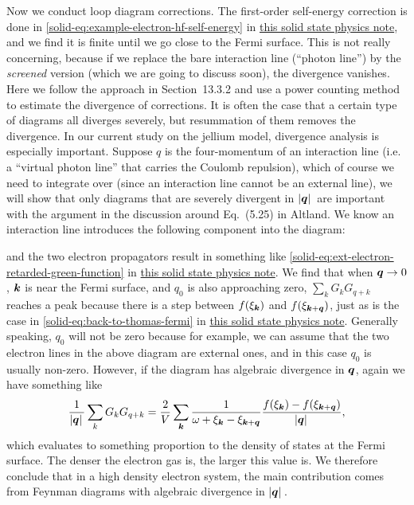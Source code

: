 \documentclass[hyperref, a4paper]{article}
\newcommand{\soliddoc}{\href{../solid/solid.pdf}{this solid state physics note}}
\begin{document}
Now we conduct loop diagram corrections. The first-order 
self-energy correction is done in \eqref{solid-eq:example-electron-hf-self-energy} in \soliddoc, and we find 
it is finite until we go close to the Fermi surface. This is not really concerning, because if we replace 
the bare interaction line (``photon line'') by the \emph{screened} version (which we are going to discuss soon), 
the divergence vanishes. Here we follow the approach in Section~13.3.2 and use a 
power counting method to estimate the divergence of corrections. It is often the case that a certain type of 
diagrams all diverges severely, but resummation of them removes the divergence. In our current study on the 
jellium model, divergence analysis is especially important. Suppose $q$ is the four-momentum of an interaction 
line (i.e. a ``virtual photon line'' that carries the Coulomb repulsion), which of course we need to integrate
over (since an interaction line cannot be an external line), we will show that only diagrams that 
are severely divergent in $\abs*{\vb*{q}}$ are important with the argument in the 
discussion around Eq.~(5.25) in Altland. 
We know an interaction line introduces the following component into the diagram:
 
and the two electron propagators result in something like \eqref{solid-eq:ext-electron-retarded-green-function} 
in \soliddoc. We find that when $\vb*{q} \to 0$, $\vb*{k}$ is near the Fermi surface, and $q_0$ is also approaching
zero, $\sum_{k} G_k G_{q+k}$ reaches a peak because there is a step between $f(\xi_{\vb*{k}})$ and 
$f(\xi_{\vb*{k} + \vb*{q}})$, just as is the case in \eqref{solid-eq:back-to-thomas-fermi} 
in \soliddoc. Generally speaking, $q_0$ will not be zero because for example, we can assume that the two 
electron lines in the above diagram are external ones, and in this case $q_0$ is usually non-zero. However, 
if the diagram has algebraic divergence in $\vb*{q}$, again we have something like 
\[
    \frac{1}{\abs*{\vb*{q}}} \sum_k G_k G_{q+k} = \frac{2}{V} \sum_{\vb*{k}} \frac{1}{\omega + \xi_{\vb*{k}} - \xi_{\vb*{k} + \vb*{q}}} \frac{f(\xi_{\vb*{k}}) - f(\xi_{\vb*{k} + \vb*{q}})}{\abs*{\vb*{q}}},
\]
which evaluates to something proportion to the density of states at the Fermi surface. The denser the electron 
gas is, the larger this value is. We therefore conclude that in a high density electron system, 
the main contribution comes from Feynman diagrams with algebraic divergence in $\abs*{\vb*{q}}$. 
\end{document}

